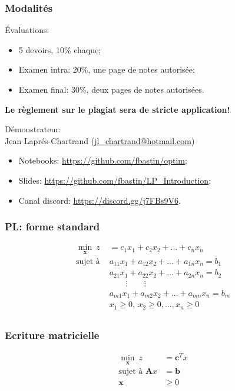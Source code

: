 \documentclass[usepdftitle=false]{beamer}
\def\bb{\boldsymbol{b}}
\def\bc{\boldsymbol{c}}
\def\bx{\boldsymbol{x}}
\def\bA{\boldsymbol{A}}
\begin{document}
\begin{frame}
\frametitle{Modalités}

Évaluations:
\begin{itemize}
	\item 5 devoirs, 10\% chaque;
	\item Examen intra: 20\%, une page de notes autorisée;
	\item Examen final: 30\%, deux pages de notes autorisées.
\end{itemize}
{\bf Le règlement sur le plagiat sera de stricte application!}

\mbox{}

Démonstrateur:\\
 Jean Laprés-Chartrand (\url{jl_chartrand@hotmail.com})\\

\mbox{}

\begin{itemize}
	\item 
Notebooks: \url{https://github.com/fbastin/optim};
\item
Slides: \url{https://github.com/fbastin/LP_Introduction};
\item
Canal discord: \url{https://discord.gg/j7FBs9V6}.
\end{itemize}

\end{frame}

\begin{frame}
\frametitle{PL: forme standard}

\begin{align*}
\min_{\bx}\ z &= c_1x_1+c_2x_2+\ldots +c_nx_n \\
\mbox{sujet à } &
a_{11}x_1 + a_{12}x_2 + \ldots + a_{1n}x_n = b_1 \\
&a_{21}x_1 + a_{22}x_2 + \ldots + a_{2n}x_n = b_2 \\
& \qquad \vdots \qquad \vdots \\
& a_{m1}x_1 + a_{m2}x_2 + \ldots + a_{mn}x_n = b_m \\
& x_1 \geq 0,\ x_2 \geq 0, \ldots, x_n \geq 0 \\
\end{align*}

\mbox{}
\end{frame}

\begin{frame}
\frametitle{Ecriture matricielle}

\begin{align*}
\min_{\bx} \ z &= \bc^T x \\
\mbox{sujet à } \bA x &= \bb \\
\bx & \geq 0
\end{align*}

\end{frame}
\end{document}
